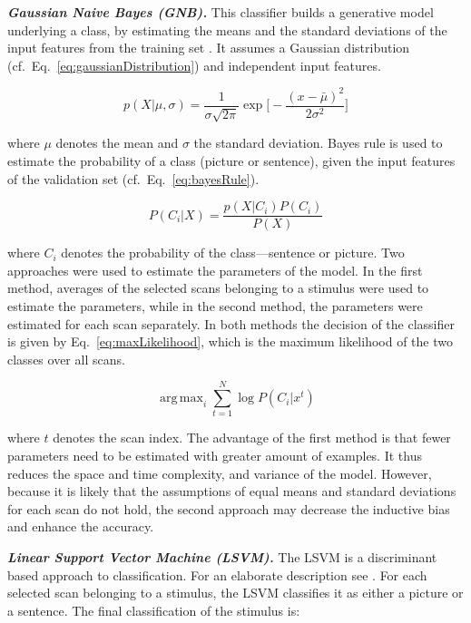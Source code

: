 \documentclass[preprint,journal,11pt]{vgtc}
\begin{document}
\textbf{\emph{Gaussian Naive Bayes (GNB).}} This classifier builds a generative model underlying a class, by estimating the means and the standard deviations of the input features from the training set \cite{bk:2004aplay}. It assumes a Gaussian distribution (cf.~Eq.~\ref{eq:gaussianDistribution}) and independent input features.

\begin{equation}
\label{eq:gaussianDistribution}
p(X|\mu, \sigma) = \frac{1}{\sigma\sqrt{2\pi}}\exp\Big[-\frac{(x - \bar{\mu})^2}{2\sigma^2}\Big]
\end{equation}

where $\mu$ denotes the mean and $\sigma$ the standard deviation. Bayes rule is used to estimate the probability of a class (picture or sentence), given the input features of the validation set (cf.~Eq.~\ref{eq:bayesRule}).

\begin{equation}
\label{eq:bayesRule}
P(C_{i}|X) = \frac{p(X|C_{i})P(C_{i})}{P(X)}
\end{equation}

where $C_i$ denotes the probability of the class---sentence or picture. Two approaches were used to estimate the parameters of the model. In the first method, averages of the selected scans belonging to a stimulus were used to estimate the parameters, while in the second method, the parameters were estimated for each scan separately. In both methods the decision of the classifier is given by Eq.~\ref{eq:maxLikelihood}, which is the maximum likelihood of the two classes over all scans.

\begin{equation}
\label{eq:maxLikelihood}
\operatorname{arg\,max}_i \sum_{t=1}^{N}{\log{P(C_{i}|x^{t})}}
\end{equation}

where $t$ denotes the scan index. The advantage of the first method is that fewer parameters need to be estimated with greater amount of examples. It thus reduces the space and time complexity, and variance of the model. However, because it is likely that the assumptions of equal means and standard deviations for each scan do not hold, the second approach may decrease the inductive bias and enhance the accuracy.

\textbf{\emph{Linear Support Vector Machine (LSVM).}} The LSVM is a discriminant based approach to classification. For an elaborate description see \cite{bk:2004aplay}. For each selected scan belonging to a stimulus, the LSVM classifies it as either a picture or a sentence. The final classification of the stimulus is:
\end{document}
